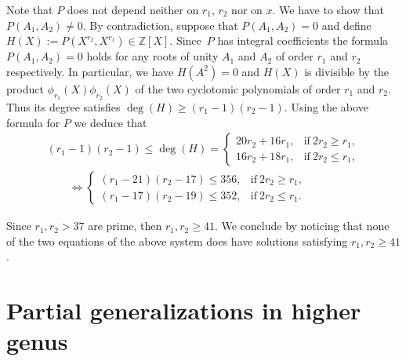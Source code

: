 \documentclass[pdftex]{sigma}
\numberwithin{equation}{section}
\begin{document}
Note that $P$ does not depend neither on $r_1$, $r_2$ nor on $x$. We have to show that $P(A_1,A_2)\neq 0$. By contradiction, suppose that $P(A_1, A_2)=0$ and define $H(X):=P(X^{r_2}, X^{r_1})\in \mathbb{Z}[X]$. Since~$P$ has integral coefficients the formula $P(A_1,A_2)=0$ holds for any roots of unity $A_1$ and $A_2$ of order $r_1$ and $r_2$ respectively. In particular, we have $H(A^2)=0$ and $H(X)$ is divisible by the product $\phi_{r_1}(X)\phi_{r_2}(X)$ of the two cyclotomic polynomials of order $r_1$ and $r_2$. Thus its degree satisfies $\deg (H) \geq (r_1-1)(r_2-1)$. Using the above formula for $P$ we deduce that
\begin{gather*}
 (r_1-1)(r_2-1) \leq \deg (H) = \begin{cases}
20r_2+16r_1, & \text{if} \ 2r_2\geq r_1, \\
16r_2 +18r_1, &\text{if} \ 2r_2\leq r_1,
\end{cases}\\
\qquad {} \Leftrightarrow
 \begin{cases}
(r_1-21)(r_2-17)\leq 356, & \text{if} \ 2r_2\geq r_1, \\
(r_1-17)(r_2-19)\leq 352, &\text{if} \ 2r_2\leq r_1.
\end{cases}
\end{gather*}

Since $r_1, r_2> 37$ are prime, then $r_1, r_2\geq 41$. We conclude by noticing that none of the two equations of the above system does have solutions satisfying $r_1, r_2\geq 41$.

\section{Partial generalizations in higher genus}
\end{document}
